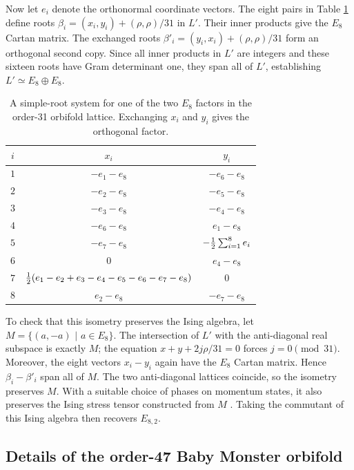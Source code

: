 \documentclass[12pt]{article}
\numberwithin{equation}{section}
\theoremstyle{remark}
\begin{document}
Now let $e_i$ denote the orthonormal coordinate vectors. The eight pairs in Table \ref{tabEeightNeighborRoots} define roots $\beta_i=(x_i,y_i)+(\rho,\rho)/31$ in $L'$. Their inner products give the $E_8$ Cartan matrix. The exchanged roots $\beta'_i=(y_i,x_i)+(\rho,\rho)/31$ form an orthogonal second copy. Since all inner products in $L'$ are integers and these sixteen roots have Gram determinant one, they span all of $L'$, establishing $L'\simeq E_8\oplus E_8$.

\begin{table}[t]
\centering
\begin{tabular}{c c c}
\toprule
$i$ & $x_i$ & $y_i$\\
\midrule
$1$ & $-e_1-e_8$ & $-e_6-e_8$\\
$2$ & $-e_2-e_8$ & $-e_5-e_8$\\
$3$ & $-e_3-e_8$ & $-e_4-e_8$\\
$4$ & $-e_6-e_8$ & $e_1-e_8$\\
$5$ & $-e_7-e_8$ & $-{1\over 2}\sum_{i=1}^8e_i$\\
$6$ & $0$ & $e_4-e_8$\\
$7$ & ${1\over 2}(e_1-e_2+e_3-e_4-e_5-e_6-e_7-e_8)$ & $0$\\
$8$ & $e_2-e_8$ & $-e_7-e_8$\\
\bottomrule
\end{tabular}
\caption{A simple-root system for one of the two $E_8$ factors in the order-31 orbifold lattice. Exchanging $x_i$ and $y_i$ gives the orthogonal factor.}
\label{tabEeightNeighborRoots}
\end{table}

To check that this isometry preserves the Ising algebra, let $M=\{(a,-a)\,\,|\,\,a\in E_8\}$. The intersection of $L'$ with the anti-diagonal real subspace is exactly $M$; the equation $x+y+2j\rho/31=0$ forces $j=0\pmod{31}$. Moreover, the eight vectors $x_i-y_i$ again have the $E_8$ Cartan matrix. Hence $\beta_i-\beta'_i$ span all of $M$. The two anti-diagonal lattices coincide, so the isometry preserves $M$. With a suitable choice of phases on momentum states, it also preserves the Ising stress tensor constructed from $M$ \cite{Chen:2014aia}. Taking the commutant of this Ising algebra then recovers $E_{8,2}$.


\subsection{Details of the order-47 Baby Monster orbifold}
\label{app:BabyScalar}
\end{document}
